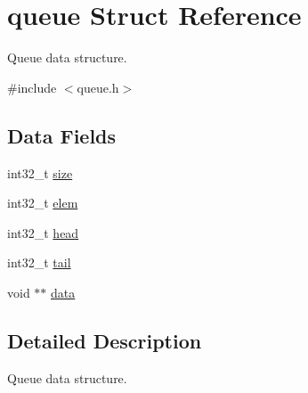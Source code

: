 \hypertarget{structqueue}{\section{queue Struct Reference}
\label{structqueue}
}


Queue data structure.  




{\ttfamily \#include $<$queue.\-h$>$}

\subsection*{Data Fields}
\begin{DoxyCompactItemize}
\item 
int32\-\_\-t \hyperlink{structqueue_af80cfabc36286195365b6d666d518504}{size}
\item 
int32\-\_\-t \hyperlink{structqueue_a187a42d061b48da53e894181758d558d}{elem}
\item 
int32\-\_\-t \hyperlink{structqueue_aec96f7889213946d685f28a0d6504428}{head}
\item 
int32\-\_\-t \hyperlink{structqueue_ada0fe9a078df1d07623c761f2e8376ad}{tail}
\item 
void $\ast$$\ast$ \hyperlink{structqueue_a794929032d575599c02f795cea4b3118}{data}
\end{DoxyCompactItemize}


\subsection{Detailed Description}
Queue data structure. 

